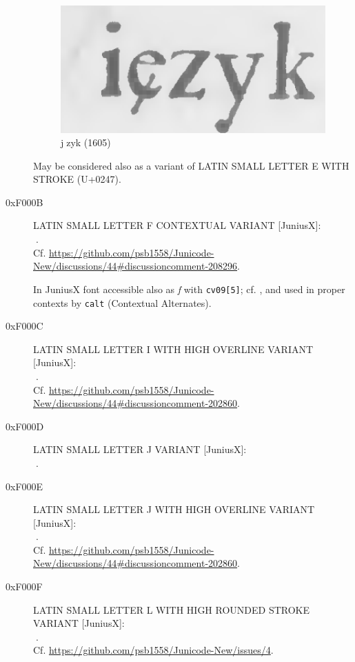 \documentclass{article}
\newcommand{\Jglyph}[1]{{\relsize{2}\J#1}}
\begin{document}
\begin{description}
  \begin{figure}[h]
    \includegraphics[width=1\hsize]{img/00436649jezyk}
    \caption{\J j󰀊zyk (1605)}
    \label{fig:e1605}
  \end{figure}

 May be considered also as a variant of LATIN SMALL LETTER E WITH
  STROKE (U+0247).

\item [0xF000B] LATIN SMALL LETTER F CONTEXTUAL VARIANT [JuniusX]:\\
  \Jglyph{󰀋}.\\  Cf. \url{https://github.com/psb1558/Junicode-New/discussions/44#discussioncomment-208296}.
  
  In JuniusX font accessible also as \textit{f} with \texttt{cv09[5]};
  cf. \autocite[p. 9]{baker20:_opent_featur_junius_junius}, and used
  in proper contexts by \texttt{calt} (Contextual Alternates).
  
\item [0xF000C] LATIN SMALL LETTER I WITH HIGH OVERLINE VARIANT [JuniusX]:\\
  \Jglyph{󰀌}.\\ Cf. \url{https://github.com/psb1558/Junicode-New/discussions/44#discussioncomment-202860}.
\item [0xF000D] LATIN SMALL LETTER J VARIANT [JuniusX]:\\
  \Jglyph{󰀍}.\\ %

\item [0xF000E] LATIN SMALL LETTER J WITH HIGH OVERLINE  VARIANT [JuniusX]:\\
  \Jglyph{󰀎}.\\ Cf. \url{https://github.com/psb1558/Junicode-New/discussions/44#discussioncomment-202860}.
\item [0xF000F] LATIN SMALL LETTER L WITH HIGH ROUNDED STROKE VARIANT [JuniusX]:\\
  \Jglyph{󰀏}.\\  Cf. \url{https://github.com/psb1558/Junicode-New/issues/4}.


\end{description}
\end{document}
